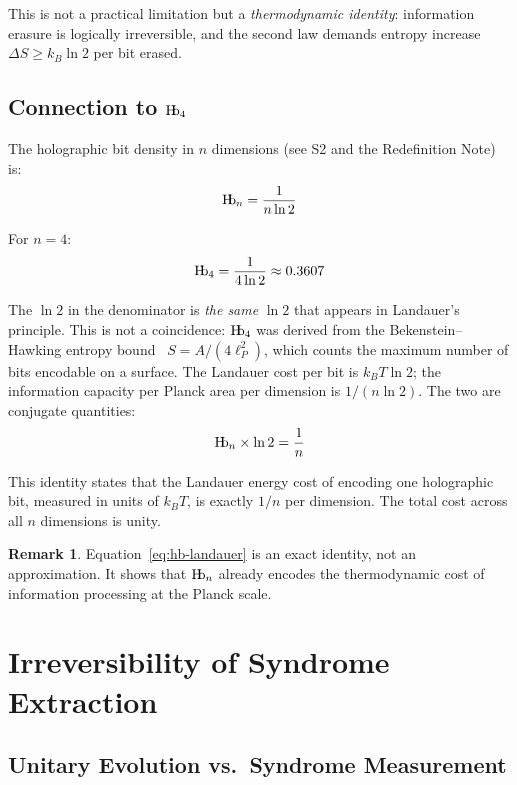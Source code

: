 \documentclass[11pt,a4paper]{article}
\theoremstyle{definition}
\newtheorem{remark}[theorem]{Remark}
\newcommand{\Hb}{\textnormal{H\kern-0.3em b}}
\newcommand{\Hbn}{\Hb_n}
\newcommand{\Hbfour}{\Hb_4}
\begin{document}
This is not a practical limitation but a \emph{thermodynamic identity}: information erasure is logically irreversible, and the second law demands entropy increase $\Delta S \geq k_B \ln 2$ per bit erased.

\subsection{Connection to $\Hbfour$}

The holographic bit density in $n$ dimensions (see S2 and the Redefinition Note) is:
\begin{equation}
    \Hbn = \frac{1}{n \ln 2}
\end{equation}

For $n = 4$:
\begin{equation}
    \Hbfour = \frac{1}{4 \ln 2} \approx 0.3607
\end{equation}

The $\ln 2$ in the denominator is \emph{the same} $\ln 2$ that appears in Landauer's principle. This is not a coincidence: $\Hbfour$ was derived from the Bekenstein--Hawking entropy bound~\cite{Bekenstein1973,Hawking1975} $S = A/(4\ell_P^2)$, which counts the maximum number of bits encodable on a surface. The Landauer cost per bit is $k_B T \ln 2$; the information capacity per Planck area per dimension is $1/(n \ln 2)$. The two are conjugate quantities:
\begin{equation}\label{eq:hb-landauer}
    \Hbn \times \ln 2 = \frac{1}{n}
\end{equation}

This identity states that the Landauer energy cost of encoding one holographic bit, measured in units of $k_B T$, is exactly $1/n$ per dimension. The total cost across all $n$ dimensions is unity.

\begin{remark}
Equation~\eqref{eq:hb-landauer} is an exact identity, not an approximation. It shows that $\Hbn$ already encodes the thermodynamic cost of information processing at the Planck scale.
\end{remark}


\section{Irreversibility of Syndrome Extraction}

\subsection{Unitary Evolution vs.\ Syndrome Measurement}
\end{document}
